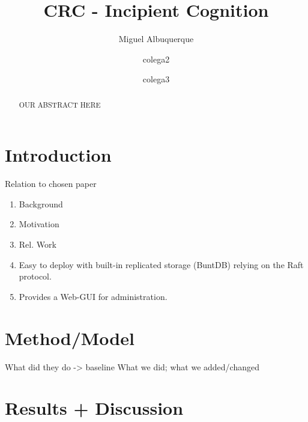 \documentclass[runningheads]{llncs}
\begin{document}
%
\title{CRC - Incipient Cognition}


%
%
\author{Miguel Albuquerque \and
colega2 \and colega3}


%
\maketitle              %
%
\begin{abstract}
OUR ABSTRACT HERE
\end{abstract}


%
%
%


\section{Introduction}

Relation to chosen paper
\begin{enumerate}
    \item Background
    \item Motivation
    \item Rel. Work
    \item Easy to deploy with built-in replicated storage (BuntDB) relying on the Raft protocol.
    \item Provides a Web-GUI for administration.
\end{enumerate}


\section{Method/Model}
What did they do -> baseline
What we did; what we added/changed


\section{Results + Discussion}
\end{document}
